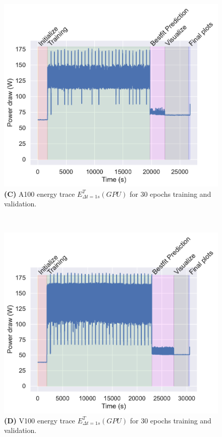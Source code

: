 \documentclass[utf8]{FrontiersinVancouver} %
\begin{document}
\begin{figure}[htb]
\begin{center}
     \begin{minipage}[b]{0.43\textwidth}
        \includegraphics[width=1.0\linewidth]{images/a100-shaded-energy-30-epochs}
        {\bf (C)} A100 energy trace $E^T_{\Delta t=1s}(GPU)$ for 30 epochs training and validation.
     \end{minipage}
     \ \
     \begin{minipage}[b]{0.43\textwidth}
        \includegraphics[width=1.0\linewidth]{images/v100-shaded-energy-30-epochs}
        {\bf (D)} V100 energy trace $E^T_{\Delta t=1s}(GPU)$ for 30 epochs training and validation.
     \end{minipage}


\end{center}
\end{figure}
\end{document}
